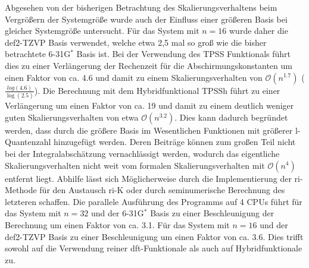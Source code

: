 \bigskip
Abgesehen von der bisherigen Betrachtung des Skalierungsverhaltens beim Vergrößern der Systemgröße wurde auch der Einfluss einer größeren Basis bei gleicher Systemgröße untersucht. Für das  System mit $n=16$ wurde daher die def2-TZVP Basis verwendet, welche etwa 2,5 mal so groß wie die bisher betrachtete 6-31G$^*$ Basis ist. Bei der Verwendung des TPSS Funktionals führt dies zu einer Verlängerung der Rechenzeit für die Abschirmungskonstanten um einen Faktor von ca. 4.6 und damit zu einem Skalierungsverhalten von $\mathcal{O}(n^{1.7})$ ($\frac{log(4.6)}{\log(2.5)}$). Die Berechnung mit dem Hybridfunktional TPSSh führt zu einer Verlängerung um einen Faktor von ca. 19 und damit zu einem deutlich weniger guten Skalierungsverhalten von etwa $\mathcal{O}(n^{3.2})$. Dies kann dadurch begründet werden, dass durch die größere Basis im Wesentlichen Funktionen mit größerer l-Quantenzahl hinzugefügt werden. Deren Beiträge können zum großen Teil nicht bei der Integralabschätzung vernachlässigt werden, wodurch das eigentliche Skalierungsverhalten nicht weit vom formalen Skalierungsverhalten mit $\mathcal{O}(n^{4})$ entfernt liegt. Abhilfe lässt sich Möglicherweise durch die Implementierung der \ac{ri}-Methode für den Austausch {\ac{ri}-K}\supercite{weigend2002fully} oder durch seminumerische Berechnung\supercite{neese2009efficient,plessow2012seminumerical} des letzteren schaffen. Die parallele Ausführung des Programms auf 4 CPUs führt für das System mit $n=32$ und der 6-31G$^*$ Basis zu einer Beschleunigung der Berechnung um einen Faktor von ca. 3.1. Für das System mit $n=16$ und der def2-TZVP Basis zu einer Beschleunigung um einen Faktor von ca. 3.6. Dies trifft sowohl auf die Verwendung reiner \ac{dft}-Funktionale als auch auf Hybridfunktionale zu.
